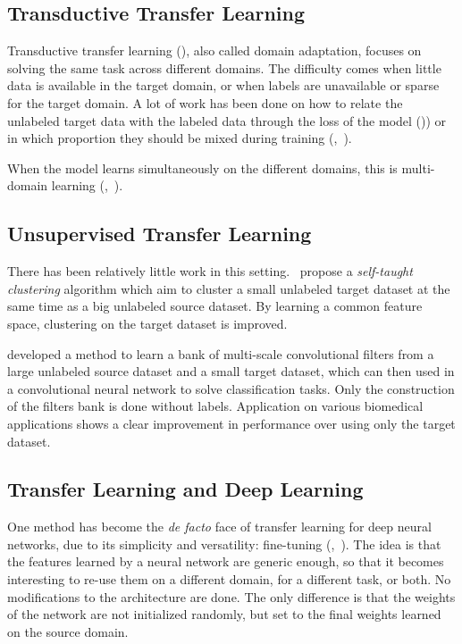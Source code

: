 \subsection{Transductive Transfer Learning}
\label{ssec:transductive}

Transductive transfer learning (\textcite{arnold2007}), also called domain adaptation, focuses on solving the same task across different domains. The difficulty comes when little data is available in the target domain, or when labels are unavailable or sparse for the target domain. A lot of work has been done on how to relate the unlabeled target data with the labeled data through the loss of the model (\textcite{arnold2007})) or in which proportion they should be mixed during training (\textcite{crammer2008JMLR},~\textcite{ben-david2010}).

When the model learns simultaneously on the different domains, this is multi-domain learning (\textcite{daume2007},~\textcite{joshi2013}).

\subsection{Unsupervised Transfer Learning}
\label{ssec:unsupervised}

There has been relatively little work in this setting.~\textcite{dai2008ICML} propose a \textit{self-taught clustering} algorithm which aim to cluster a small unlabeled target dataset at the same time as a big unlabeled source dataset. By learning a common feature space, clustering on the target dataset is improved.

\textcite{chang2018} developed a method to learn a bank of multi-scale convolutional filters from a large unlabeled source dataset and a small target dataset, which can then used in a convolutional neural network to solve classification tasks. Only the construction of the filters bank is done without labels. Application on various biomedical applications shows a clear improvement in performance over using only the target dataset.

\subsection{Transfer Learning and Deep Learning}
\label{ssec:deep_transfer}

One method has become the \textit{de facto} face of transfer learning for deep neural networks, due to its simplicity and versatility: fine-tuning (\textcite{hinton2006},~\textcite{bengio2007NIPS}). The idea is that the features learned by a neural network are generic enough, so that it becomes interesting to re-use them on a different domain, for a different task, or both. No modifications to the architecture are done. The only difference is that the weights of the network are not initialized randomly, but set to the final weights learned on the source domain.

